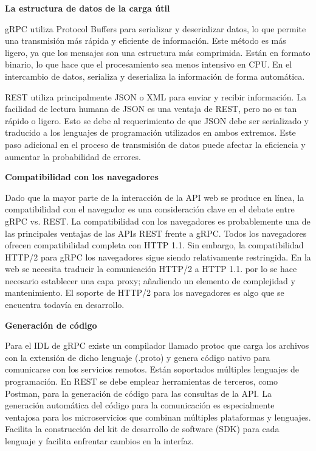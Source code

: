 \textbf{La estructura de datos de la carga útil}

gRPC utiliza Protocol Buffers para serializar y deserializar datos, lo que permite una transmisión más rápida y eficiente de información.
Este método es más ligero, ya que los mensajes son una estructura más comprimida.
Están en formato binario, lo que hace que el procesamiento sea menos intensivo en CPU.
En el intercambio de datos, serializa y deserializa la información de forma automática.

REST utiliza principalmente JSON o XML para enviar y recibir información.
La facilidad de lectura humana de JSON es una ventaja de REST, pero no es tan rápido o ligero.
Esto se debe al requerimiento de que JSON debe ser serializado y traducido a los lenguajes de programación utilizados en ambos extremos.
Este paso adicional en el proceso de transmisión de datos puede afectar la eficiencia y aumentar la probabilidad de errores.


\textbf{Compatibilidad con los navegadores}\label{GRPCcompatibilidadConNavegadores}

Dado que la mayor parte de la interacción de la API web se produce en línea, la compatibilidad con el navegador es una consideración clave en el debate entre gRPC vs.
REST. La compatibilidad con los navegadores es probablemente una de las principales ventajas de las APIs REST frente a gRPC. Todos los navegadores ofrecen compatibilidad completa con HTTP 1.1. Sin embargo, la compatibilidad HTTP/2 para gRPC los navegadores sigue siendo relativamente restringida.
En la web se necesita traducir la comunicación  HTTP/2 a HTTP 1.1. por lo se hace necesario establecer una capa proxy; añadiendo un elemento de complejidad y mantenimiento.
El soporte de HTTP/2 para los navegadores es algo que se encuentra todavía en desarrollo.

\textbf{Generación de código}

Para el IDL de gRPC existe un compilador llamado protoc que carga los archivos con la extensión de dicho lenguaje (.proto) y genera código nativo para comunicarse con los servicios remotos.
Están soportados múltiples lenguajes de programación.
En REST se debe emplear herramientas de terceros, como Postman, para la generación de código para las consultas de la API. La generación automática del código para la comunicación es especialmente ventajosa para los microservicios que combinan múltiples plataformas y lenguajes.
Facilita la construcción del kit de desarrollo de software (SDK) para cada lenguaje y facilita enfrentar cambios en la interfaz.

